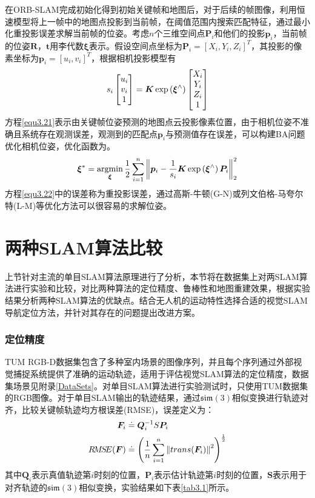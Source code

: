在ORB-SLAM完成初始化得到初始关键帧和地图后，对于后续的帧图像，利用恒速模型将上一帧中的地图点投影到当前帧，在阈值范围内搜索匹配特征，通过最小化重投影误差求解当前帧的位姿。考虑$n$个三维空间点$\boldsymbol{P}_i$和他们的投影$\boldsymbol{p}_i$，当前帧的位姿$\boldsymbol{R}$，$\boldsymbol{t}$用李代数$\boldsymbol{\xi}$表示。假设空间点坐标为$\boldsymbol{P}_i=[X_i,Y_i,Z_i]^T$，其投影的像素坐标为$\boldsymbol{p}_i = [u_i,v_i]^T$，根据相机投影模型有
\begin{equation}
\label{equ3.21}
s_i
\begin{bmatrix}
u_i \cr v_i \cr 1\cr 
\end{bmatrix}
=
\boldsymbol{K} \exp\left( \boldsymbol{\xi}^{\wedge} \right)
\begin{bmatrix}
X_i \cr Y_i \cr Z_i \cr 1 \cr
\end{bmatrix}
\end{equation}
方程\eqref{equ3.21}表示由关键帧位姿预测的地图点云投影像素位置，由于相机位姿不准确且系统存在观测误差，观测到的匹配点$\boldsymbol{p}_i$与预测值存在误差，可以构建BA问题优化相机位姿，优化函数为。
\begin{equation}
\label{equ3.22}
\boldsymbol{\xi}^* = \operatorname*{argmin}\limits_{\boldsymbol{\xi}} {1 \over 2} \sum\limits_{i=1}^n  \left \Vert \boldsymbol{p}_i - {1 \over s_i} \boldsymbol{K} \exp\left( \boldsymbol{\xi}^{\wedge} \right) \boldsymbol{P}_i  \right \Vert_2^2
\end{equation}
方程\eqref{equ3.22}中的误差称为重投影误差，通过高斯-牛顿(G-N)或列文伯格-马夸尔特(L-M)等优化方法可以很容易的求解位姿。

\section{两种SLAM算法比较}
上节针对主流的单目SLAM算法原理进行了分析，本节将在数据集上对两SLAM算法进行实验和比较，对比两种算法的定位精度、鲁棒性和地图重建效果，根据实验结果分析两种SLAM算法的优缺点。结合无人机的运动特性选择合适的视觉SLAM导航定位方法，并针对其存在的问题提出改进方案。

\subsubsection{定位精度}
TUM RGB-D数据集\upcite{[3.12]}包含了多种室内场景的图像序列，并且每个序列通过外部视觉捕捉系统提供了准确的运动轨迹，适用于评估视觉SLAM算法的定位精度，数据集场景见附录\ref{DataSets}。对单目SLAM算法进行实验测试时，只使用TUM数据集的RGB图像。对于单目SLAM输出的轨迹结果，通过$\mathfrak{sim}(3)$相似变换进行轨迹对齐，比较关键帧轨迹均方根误差(RMSE)，误差定义为：
\begin{equation}
\label{equ3.23}
\begin{aligned}
\boldsymbol{F}_i &\doteq \boldsymbol{Q}_i^{-1} S \boldsymbol{P}_i
\\ 
R\!M\!S\!E(\boldsymbol{F}) &\doteq \left( {1 \over n} \sum\limits_{i=1}^n \left \Vert trans(\boldsymbol{F}_i) \right \Vert^2 \right)^{1 \over 2} 
\end{aligned}
\end{equation}
其中$\boldsymbol{Q}_i$表示真值轨迹第$i$时刻的位置，$\boldsymbol{P}_i$表示估计轨迹第$i$时刻的位置，$\boldsymbol{S}$表示用于对齐轨迹的$\mathfrak{sim}(3)$相似变换，实验结果如下表\ref{tab3.1}所示。

